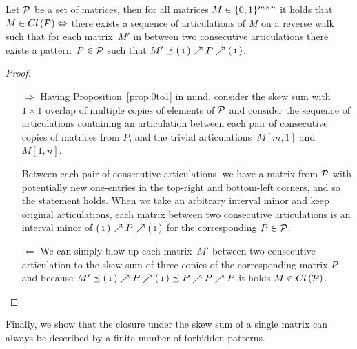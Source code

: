 \begin{lemma}
\label{lemma:artic}
Let $\mathcal{P}$ be a set of matrices, then for all matrices $M\in\{0,1\}^{m\times n}$ it holds that $M\in Cl\left(\mathcal{P}\right)\Leftrightarrow$ there exists a sequence of articulations of $M$ on a reverse walk such that for each matrix~$M'$ in between two consecutive articulations there exists a pattern~$P\in\mathcal{P}$ such that $M'\preceq\left(\begin{smallmatrix}1\end{smallmatrix}\right)\nearrow P\nearrow\left(\begin{smallmatrix}1\end{smallmatrix}\right)$.
\end{lemma}
\begin{proof}
\begin{itemize}
	\item[$\Rightarrow$] Having Proposition~\ref{prop:0to1} in mind, consider the skew sum with $1\times1$ overlap of multiple copies of elements of $\mathcal{P}$ and consider the sequence of articulations containing an articulation between each pair of consecutive copies of matrices from $P$, and the trivial articulations~$M[m,1]$ and $M[1,n]$.
	
	Between each pair of consecutive articulations, we have a matrix from $\mathcal{P}$ with potentially new one-entries in the top-right and bottom-left corners, and so the statement holds. When we take an arbitrary interval minor and keep original articulations, each matrix between two consecutive articulations is an interval minor of $\left(\begin{smallmatrix}1\end{smallmatrix}\right)\nearrow P\nearrow\left(\begin{smallmatrix}1\end{smallmatrix}\right)$ for the corresponding $P\in\mathcal{P}$.
	\item[$\Leftarrow$] We can simply blow up each matrix~$M'$ between two consecutive articulation to the skew sum of three copies of the corresponding matrix $P$ and because $M'\preceq\left(\begin{smallmatrix}1\end{smallmatrix}\right)\nearrow P\nearrow\left(\begin{smallmatrix}1\end{smallmatrix}\right)\preceq P\nearrow P\nearrow P$ it holds $M\in Cl\left(\mathcal{P}\right)$. \qedhere
\end{itemize}
\end{proof}

Finally, we show that the closure under the skew sum of a single matrix can always be described by a finite number of forbidden patterns.

